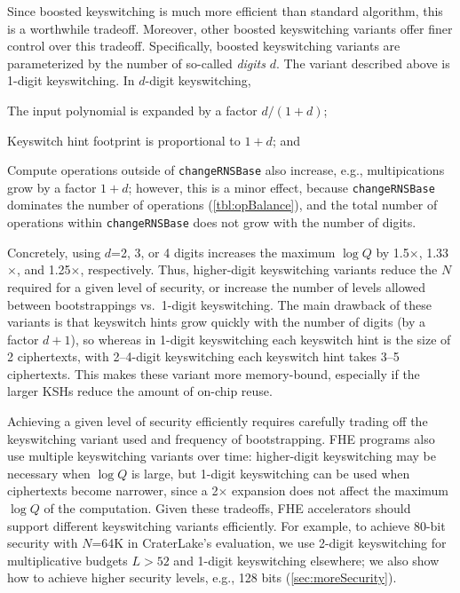 Since boosted keyswitching is much more efficient than standard algorithm, this
is a worthwhile tradeoff. Moreover, other boosted keyswitching variants offer
finer control over this tradeoff. Specifically, boosted keyswitching variants
are parameterized by the number of so-called \emph{digits} $d$. The variant
described above is 1-digit keyswitching.
In $d$-digit keyswitching,
\begin{compactenum}
\item The input polynomial is expanded by a factor $d/(1+d)$;
\item Keyswitch hint footprint is proportional to $1+d$; and
\item Compute operations outside of \texttt{changeRNSBase} also increase, e.g.,
    multipications grow by a factor $1+d$; however, this is a minor effect,
    because \texttt{changeRNSBase} dominates the number of operations
    (\autoref{tbl:opBalance}), and the total number of operations within
    \texttt{changeRNSBase} does not grow with the number of digits.
\end{compactenum}

Concretely, using $d$=2, 3, or 4 digits increases the maximum $\log Q$ by
1.5$\times$, 1.33$\times$, and 1.25$\times$, respectively. Thus, higher-digit
keyswitching variants reduce the $N$ required for a given level of security, or
increase the number of levels allowed between bootstrappings vs.\ 1-digit
keyswitching. The main drawback of these variants is that keyswitch hints grow
quickly with the number of digits (by a factor $d+1$), so whereas in 1-digit
keyswitching each keyswitch hint is the size of 2 ciphertexts, with 2--4-digit
keyswitching each keyswitch hint takes 3--5 ciphertexts. This makes these
variant more memory-bound, especially if the larger KSHs reduce the amount of
on-chip reuse.

Achieving a given level of security efficiently requires carefully trading off
the keyswitching variant used and frequency of bootstrapping. FHE programs also
use multiple keyswitching variants over time: higher-digit keyswitching may be
necessary when $\log Q$ is large, but 1-digit keyswitching can be used when
ciphertexts become narrower, since a 2$\times$ expansion does not affect the
maximum $\log Q$ of the computation. Given these tradeoffs, FHE accelerators
should support different keyswitching variants efficiently. For example, to
achieve 80-bit security with $N$=64K in CraterLake's evaluation, we use 2-digit
keyswitching for multiplicative budgets $L>52$ and 1-digit keyswitching
elsewhere; we also show how to achieve higher security levels, e.g., 128 bits
(\autoref{sec:moreSecurity}).

